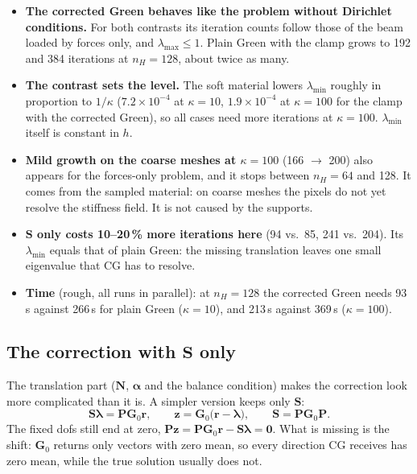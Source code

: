 \documentclass[11pt,a4paper]{article}
\begin{document}
\begin{itemize}
  \item \textbf{The corrected Green behaves like the problem without Dirichlet conditions.} For both contrasts its
        iteration counts follow those of the beam loaded by forces only, and $\lambda_{\max} \le 1$. Plain Green with the
        clamp grows to 192 and 384 iterations at $n_H = 128$, about twice as many.
  \item \textbf{The contrast sets the level.} The soft material lowers $\lambda_{\min}$ roughly in proportion to $1/\kappa$
        ($7.2\times10^{-4}$ at $\kappa = 10$, $1.9\times10^{-4}$ at $\kappa = 100$ for the clamp with the corrected Green),
        so all cases need more iterations at $\kappa = 100$. $\lambda_{\min}$ itself is constant in $h$.
  \item \textbf{Mild growth on the coarse meshes at $\kappa = 100$} (166 $\to$ 200) also appears for the forces-only
        problem, and it stops between $n_H = 64$ and 128. It comes from the sampled material: on coarse meshes the
        pixels do not yet resolve the stiffness field. It is not caused by the supports.
  \item \textbf{$\mathbf{S}$ only costs 10--20\,\% more iterations here} (94 vs.\ 85, 241 vs.\ 204). Its $\lambda_{\min}$
        equals that of plain Green: the missing translation leaves one small eigenvalue that CG has to resolve.
  \item \textbf{Time} (rough, all runs in parallel): at $n_H = 128$ the corrected Green needs 93\,s against 266\,s for
        plain Green ($\kappa = 10$), and 213\,s against 369\,s ($\kappa = 100$).
\end{itemize}

\subsection*{The correction with $\mathbf{S}$ only}
\label{sec:s_only}

The translation part ($\mathbf{N}$, $\boldsymbol{\alpha}$ and the balance condition) makes the correction look more
complicated than it is. A simpler version keeps only $\mathbf{S}$:
\[
  \mathbf{S}\boldsymbol{\lambda} = \mathbf{P}\mathbf{G}_0\mathbf{r}, \qquad
  \mathbf{z} = \mathbf{G}_0\bigl(\mathbf{r} - \boldsymbol{\lambda}\bigr), \qquad
  \mathbf{S} = \mathbf{P}\mathbf{G}_0\mathbf{P}.
\]
The fixed dofs still end at zero, $\mathbf{P}\mathbf{z} = \mathbf{P}\mathbf{G}_0\mathbf{r} - \mathbf{S}\boldsymbol{\lambda} =
\mathbf{0}$. What is missing is the shift: $\mathbf{G}_0$ returns only vectors with zero mean, so every direction CG
receives has zero mean, while the true solution usually does not.
\end{document}
